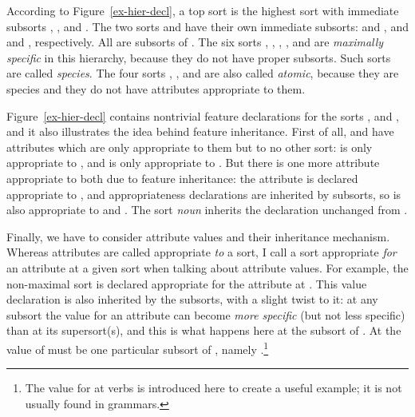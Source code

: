 \documentclass[output=paper
                ,modfonts
                ,nonflat
	        ,collection
	        ,collectionchapter
	        ,collectiontoclongg
 	        ,biblatex
                ,babelshorthands
                ,newtxmath
                ,draftmode
                ,colorlinks, citecolor=brown
]{./langsci/langscibook}
\begin{document}
{%

According to Figure~\ref{ex-hier-decl}, a top sort  is
the highest sort with immediate subsorts , ,
 and . The two sorts  and
 have their own immediate subsorts:  and ,
and  and , respectively. All are subsorts of
. The six sorts , , ,
,  and  are \emph{maximally specific} in
this hierarchy, because they do not have proper subsorts. Such sorts are
called \emph{species}. The four sorts , ,
 and  are also called \emph{atomic}, because they are species
and they do not have attributes appropriate to them.

Figure~\ref{ex-hier-decl} contains nontrivial feature declarations for the sorts
,  and , and it also illustrates
the idea behind feature inheritance. First of all,  and
 have attributes which are only appropriate to them but to
no other sort:  is only appropriate to ,
and  is only appropriate to . But there is
one more attribute appropriate to both due to feature inheritance:
the attribute  is declared appropriate to ,
and appropriateness declarations are inherited by subsorts, so 
is also appropriate to  and . The sort \emph{noun}
inherits the declaration unchanged from .

Finally, we have to consider attribute values and their inheritance
mechanism. Whereas attributes are called appropriate \emph{to} a sort,
I call a sort appropriate \emph{for} an attribute at a given sort when
talking about attribute values. For example, the non-maximal sort
 is declared appropriate for the attribute 
at . This value declaration is also inherited by the
subsorts, with a slight twist to it: at any subsort the value for an
attribute can become \emph{more specific} (but not less specific) than
at its supersort(s), and this is what happens here at the subsort
 of .  At  the value of
 must be one particular subsort of , namely
.\footnote{The  value for  at verbs
  is introduced here to create a useful example; it is not usually
found in grammars.}

}
\end{document}
